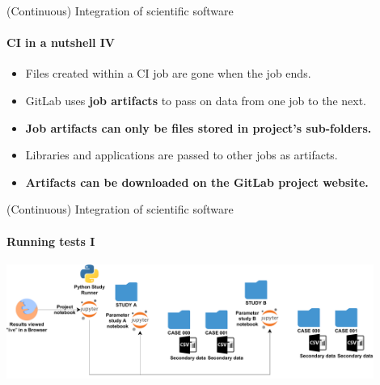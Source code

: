 \begin{frame}{(Continuous) Integration of scientific software} 
\framesubtitle{CI in a nutshell IV}
    \vfill

    \begin{itemize}
        \item Files created within a CI job are gone when the job ends. 
        \item GitLab uses \textbf{job artifacts} to pass on data from one job to the next. 
        \item \textbf{Job artifacts can only be files stored in project's sub-folders.} 
        \item Libraries and applications are passed to other jobs as artifacts. 
        \item \textbf{Artifacts can be downloaded on the GitLab project website.}
    \end{itemize}

\end{frame}

\begin{frame}{(Continuous) Integration of scientific software} 
\framesubtitle{Running tests I}
\vfill

\begin{center}
    \includegraphics[width=0.9\textwidth]{figures/Cluster-Parameter-Study-Organization.pdf}
\end{center}

\end{frame}

